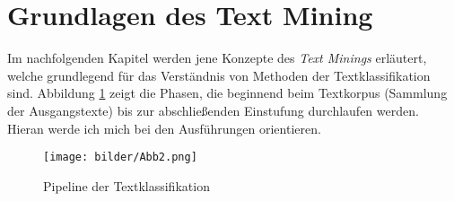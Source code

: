 \section{Grundlagen des Text Mining}\raggedbottom
Im nachfolgenden Kapitel werden jene Konzepte des \textit{Text Minings} erläutert, welche grundlegend für das Verständnis von Methoden der Textklassifikation sind. Abbildung \ref{pipetk} zeigt die Phasen, die beginnend beim Textkorpus (Sammlung der Ausgangstexte) bis zur abschließenden Einstufung durchlaufen werden. Hieran werde ich mich bei den Ausführungen orientieren.
\begin{figure}[htb]
	\begin{center}
		\texttt{[image: bilder/Abb2.png]}
		\caption{Pipeline der Textklassifikation \citep{Kow19}  }\label{pipetk}
	\end{center}
\end{figure}

